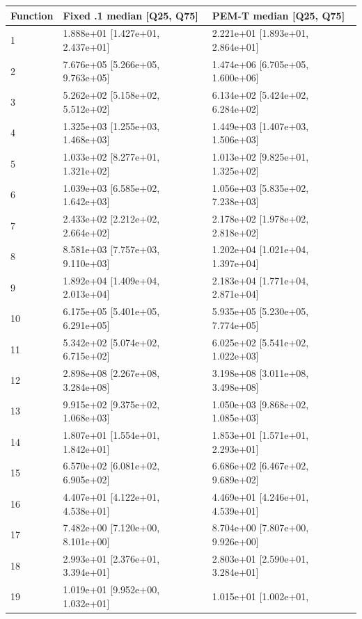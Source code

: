 \documentclass[11pt,a4paper]{article}
\begin{document}
\par\noindent\begin{minipage}{\linewidth}

\begin{longtable}[]{@{}lll@{}}
\toprule
Function & Fixed .1 median {[}Q25, Q75{]} & PEM-T median {[}Q25,
Q75{]} \\
\midrule
\endhead
1 & 1.888e+01 {[}1.427e+01, 2.437e+01{]} & 2.221e+01 {[}1.893e+01,
2.864e+01{]} \\
2 & 7.676e+05 {[}5.266e+05, 9.763e+05{]} & 1.474e+06 {[}6.705e+05,
1.600e+06{]} \\
3 & 5.262e+02 {[}5.158e+02, 5.512e+02{]} & 6.134e+02 {[}5.424e+02,
6.284e+02{]} \\
4 & 1.325e+03 {[}1.255e+03, 1.468e+03{]} & 1.449e+03 {[}1.407e+03,
1.506e+03{]} \\
5 & 1.033e+02 {[}8.277e+01, 1.321e+02{]} & 1.013e+02 {[}9.825e+01,
1.325e+02{]} \\
6 & 1.039e+03 {[}6.585e+02, 1.642e+03{]} & 1.056e+03 {[}5.835e+02,
7.238e+03{]} \\
7 & 2.433e+02 {[}2.212e+02, 2.664e+02{]} & 2.178e+02 {[}1.978e+02,
2.818e+02{]} \\
8 & 8.581e+03 {[}7.757e+03, 9.110e+03{]} & 1.202e+04 {[}1.021e+04,
1.397e+04{]} \\
9 & 1.892e+04 {[}1.409e+04, 2.013e+04{]} & 2.183e+04 {[}1.771e+04,
2.871e+04{]} \\
10 & 6.175e+05 {[}5.401e+05, 6.291e+05{]} & 5.935e+05 {[}5.230e+05,
7.774e+05{]} \\
11 & 5.342e+02 {[}5.074e+02, 6.715e+02{]} & 6.025e+02 {[}5.541e+02,
1.022e+03{]} \\
12 & 2.898e+08 {[}2.267e+08, 3.284e+08{]} & 3.198e+08 {[}3.011e+08,
3.498e+08{]} \\
13 & 9.915e+02 {[}9.375e+02, 1.068e+03{]} & 1.050e+03 {[}9.868e+02,
1.085e+03{]} \\
14 & 1.807e+01 {[}1.554e+01, 1.842e+01{]} & 1.853e+01 {[}1.571e+01,
2.293e+01{]} \\
15 & 6.570e+02 {[}6.081e+02, 6.905e+02{]} & 6.686e+02 {[}6.467e+02,
9.689e+02{]} \\
16 & 4.407e+01 {[}4.122e+01, 4.538e+01{]} & 4.469e+01 {[}4.246e+01,
4.539e+01{]} \\
17 & 7.482e+00 {[}7.120e+00, 8.101e+00{]} & 8.704e+00 {[}7.807e+00,
9.926e+00{]} \\
18 & 2.993e+01 {[}2.376e+01, 3.394e+01{]} & 2.803e+01 {[}2.590e+01,
3.284e+01{]} \\
19 & 1.019e+01 {[}9.952e+00, 1.032e+01{]} & 1.015e+01 {[}1.002e+01,

\end{longtable}
\end{minipage}
\end{document}
